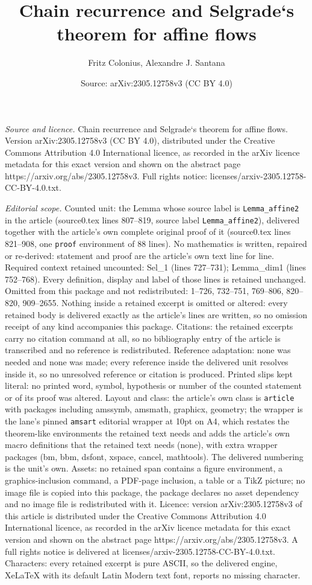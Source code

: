 \documentclass[10pt,a4paper]{amsart}
\title[Chain recurrence and Selgrade`s theorem for affine flows]{Chain recurrence and Selgrade`s theorem for affine flows}
\author{Fritz Colonius, Alexandre J. Santana}
\date{Source: arXiv:2305.12758v3 (CC BY 4.0)}
\begin{document}
\maketitle

\noindent\emph{Source and licence.} Chain recurrence and Selgrade`s theorem for affine flows. Version arXiv:2305.12758v3 (CC BY 4.0), distributed under the Creative Commons Attribution 4.0 International licence, as recorded in the arXiv licence metadata for this exact version and shown on the abstract page https://arxiv.org/abs/2305.12758v3. Full rights notice: licenses/arxiv-2305.12758-CC-BY-4.0.txt.\par\smallskip

\noindent\textit{Editorial scope.} Counted unit: the Lemma whose source label is \texttt{Lemma\_affine2} in the article (source0.tex lines 807--819, source label \texttt{Lemma\_affine2}), delivered together with the article's own complete original proof of it (source0.tex lines 821--908, one \texttt{proof} environment of 88 lines). No mathematics is written, repaired or re-derived: statement and proof are the article's own text line for line. Required context retained uncounted: Sel\_1 (lines 727--731); Lemma\_dim1 (lines 752--768). Every definition, display and label of those lines is retained unchanged. Omitted from this package and not redistributed: 1--726, 732--751, 769--806, 820--820, 909--2655. Nothing inside a retained excerpt is omitted or altered: every retained body is delivered exactly as the article's lines are written, so no omission receipt of any kind accompanies this package. Citations: the retained excerpts carry no citation command at all, so no bibliography entry of the article is transcribed and no reference is redistributed. Reference adaptation: none was needed and none was made; every reference inside the delivered unit resolves inside it, so no unresolved reference or citation is produced. Printed slips kept literal: no printed word, symbol, hypothesis or number of the counted statement or of its proof was altered. Layout and class: the article's own class is \texttt{article} with packages including amssymb, amsmath, graphicx, geometry; the wrapper is the lane's pinned \texttt{amsart} editorial wrapper at 10pt on A4, which restates the theorem-like environments the retained text needs and adds the article's own macro definitions that the retained text needs (none), with extra wrapper packages (bm, bbm, dsfont, xspace, cancel, mathtools). The delivered numbering is the unit's own. Assets: no retained span contains a figure environment, a graphics-inclusion command, a PDF-page inclusion, a table or a TikZ picture; no image file is copied into this package, the package declares no asset dependency and no image file is redistributed with it. Licence: version arXiv:2305.12758v3 of this article is distributed under the Creative Commons Attribution 4.0 International licence, as recorded in the arXiv licence metadata for this exact version and shown on the abstract page https://arxiv.org/abs/2305.12758v3. A full rights notice is delivered at licenses/arxiv-2305.12758-CC-BY-4.0.txt. Characters: every retained excerpt is pure ASCII, so the delivered engine, XeLaTeX with its default Latin Modern text font, reports no missing character.
\end{document}
